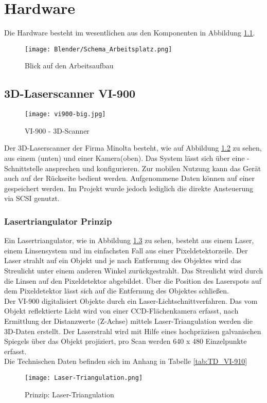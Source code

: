 \chapter{Hardware}
\label{sec:Hardware}
Die Hardware besteht im wesentlichen aus den Komponenten in Abbildung \ref{fig:Übersicht}.
\begin{figure}[htb]
\centering
\texttt{[image: Blender/Schema\_Arbeitsplatz.png]}
\caption{Blick auf den Arbeitsaufbau}
\label{fig:Übersicht}
\end{figure}

\section{3D-Laserscanner VI-900}
\begin{figure}[htb]
\centering
\texttt{[image: vi900-big.jpg]}
\caption{VI-900 - 3D-Scanner}
\label{fig:VI900}
\end{figure}
Der 3D-Laserscanner  der Firma Minolta besteht, wie auf Abbildung \ref{fig:VI900} zu sehen, aus einem (unten) und einer Kamera(oben). Das System lässt sich über eine -Schnittstelle ansprechen und konfigurieren. Zur mobilen Nutzung kann das Gerät auch auf der Rückseite bedient werden. Aufgenommene Daten können auf einer  gespeichert werden. Im Projekt wurde jedoch lediglich die direkte Ansteuerung via SCSI genutzt.
\subsection{Lasertriangulator Prinzip}
Ein Lasertriangulator, wie in Abbildung \ref{fig:LaserTriangulator} zu sehen, besteht aus einem Laser, einem Linsensystem und im einfachsten Fall aus einer Pixeldetektorzeile. Der Laser strahlt auf ein Objekt und je nach Entfernung des Objektes wird das Streulicht unter einem anderen Winkel zurückgestrahlt. Das Streulicht wird durch die Linsen auf den Pixeldetektor abgebildet. Über die Position des Laserspots auf dem Pixeldetektor lässt sich auf die Entfernung des Objektes schließen.\\
Der VI-900 digitalisiert Objekte durch ein Laser-Lichtschnittverfahren. Das vom Objekt reflektierte Licht wird von einer CCD-Flächenkamera erfasst, nach Ermittlung der Distanzwerte (Z-Achse) mittels Laser-Triangulation werden die 3D-Daten erstellt. Der Laserstrahl wird mit Hilfe eines hochpräzisen galvanischen Spiegels über das Objekt projiziert, pro Scan werden 640 x 480 Einzelpunkte erfasst.\cite{Minolta:Einleitung}\\
Die Technischen Daten befinden sich im Anhang in Tabelle \ref{tab:TD_VI-910}
\begin{figure}[htb]
\centering
\texttt{[image: Laser-Triangulation.png]}
\caption{Prinzip: Laser-Triangulation}
\label{fig:LaserTriangulator}
\end{figure}
